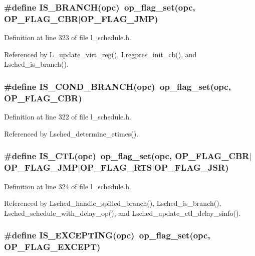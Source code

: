 \subsubsection{\setlength{\rightskip}{0pt plus 5cm}\#define IS\_\-BRANCH(opc)~op\_\-flag\_\-set(opc, OP\_\-FLAG\_\-CBR$|$OP\_\-FLAG\_\-JMP)}\label{l__schedule_8h_729ec4e90dc5212fbe085b2daf20dd48}




Definition at line 323 of file l\_\-schedule.h.

Referenced by L\_\-update\_\-virt\_\-reg(), Lregpres\_\-init\_\-cb(), and Lsched\_\-is\_\-branch().
\subsubsection{\setlength{\rightskip}{0pt plus 5cm}\#define IS\_\-COND\_\-BRANCH(opc)~op\_\-flag\_\-set(opc, OP\_\-FLAG\_\-CBR)}\label{l__schedule_8h_f60b61d9aa08c98c539bc0ee46c99305}




Definition at line 322 of file l\_\-schedule.h.

Referenced by Lsched\_\-determine\_\-etimes().
\subsubsection{\setlength{\rightskip}{0pt plus 5cm}\#define IS\_\-CTL(opc)~op\_\-flag\_\-set(opc, OP\_\-FLAG\_\-CBR$|$OP\_\-FLAG\_\-JMP$|$OP\_\-FLAG\_\-RTS$|$OP\_\-FLAG\_\-JSR)}\label{l__schedule_8h_915fa5b082d3211a2c8763c0d955c71e}




Definition at line 324 of file l\_\-schedule.h.

Referenced by Lsched\_\-handle\_\-spilled\_\-branch(), Lsched\_\-is\_\-branch(), Lsched\_\-schedule\_\-with\_\-delay\_\-op(), and Lsched\_\-update\_\-ctl\_\-delay\_\-sinfo().
\subsubsection{\setlength{\rightskip}{0pt plus 5cm}\#define IS\_\-EXCEPTING(opc)~op\_\-flag\_\-set(opc, OP\_\-FLAG\_\-EXCEPT)}\label{l__schedule_8h_349208a9816a53a3979e5dff18b5e96b}




